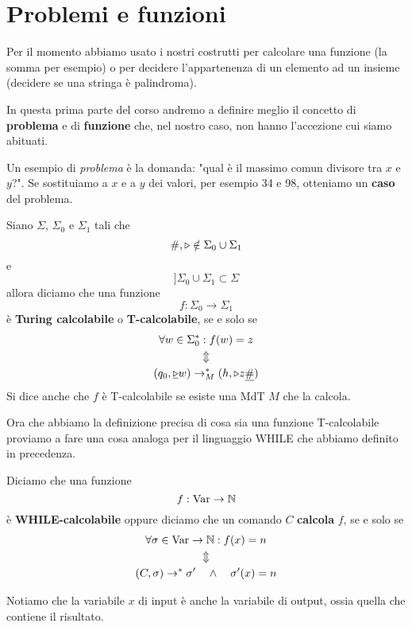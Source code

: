 \section{Problemi e funzioni}
Per il momento abbiamo usato i nostri costrutti per calcolare
una funzione (la somma per esempio) o per decidere
l'appartenenza di un elemento ad un insieme (decidere se una
stringa è palindroma).

In questa prima parte del corso andremo a definire meglio il
concetto di \textbf{problema} e di \textbf{funzione} che, nel
nostro caso, non hanno l'accezione cui siamo abituati.

Un esempio di \emph{problema} è la domanda: "qual è il massimo
comun divisore tra $x$ e $y$?". Se sostituiamo a $x$ e a $y$
dei valori, per esempio 34 e 98, otteniamo un \textbf{caso}
del problema.

\begin{definition}
	Siano $\Sigma$, $\Sigma_0$ e $\Sigma_1$ tali che
	\[ \#, \triangleright \notin \Sigma_0 \cup \Sigma_1 \]
	e
	\[ ]\Sigma_0 \cup \Sigma_1 \subset \Sigma \]
	allora diciamo che una funzione
	\[ f : \Sigma_0 \to \Sigma_1 \]
	è \textbf{Turing calcolabile} o \textbf{T-calcolabile},
	se e solo se
	\begin{gather*}
		\forall w \in \Sigma_0^* : f(w) = z \\
		\Updownarrow \\
		(q_0, \underline{\triangleright} w) \to_M^*
		(h, \triangleright z \underline{\#})
	\end{gather*}
	Si dice anche che $f$ è T-calcolabile se esiste una MdT
	$M$ che la calcola.
\end{definition}

Ora che abbiamo la definizione precisa di cosa sia una
funzione T-calcolabile proviamo a fare una cosa analoga per
il linguaggio WHILE che abbiamo definito in precedenza.

\begin{definition}
	Diciamo che una funzione
	\[ f : \operatorname{Var} \to \mathbb{N} \]
	è \textbf{WHILE-calcolabile} oppure diciamo che un comando
	$C$ \textbf{calcola} $f$, se e solo se
	\begin{gather*}
		\forall \sigma \in \operatorname{Var} \to \mathbb{N} : f(x) = n \\
		\Updownarrow \\
		(C, \sigma) \to^* \sigma' \quad \land \quad
		\sigma'(x) = n
	\end{gather*}
\end{definition}

Notiamo che la variabile $x$ di input è anche la variabile
di output, ossia quella che contiene il risultato.

